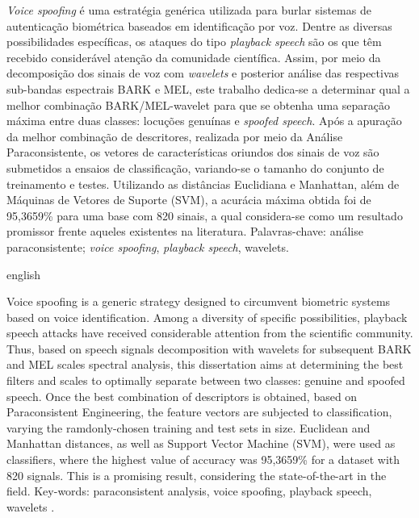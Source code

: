 \begin{resumo}
	\par \textit{Voice spoofing} é uma estratégia genérica utilizada para burlar sistemas de autenticação biométrica baseados em identificação por voz. Dentre as diversas possibilidades específicas, os ataques do tipo \textit{playback speech} são os que têm recebido considerável atenção da comunidade científica. Assim, por meio da decomposição dos sinais de voz com \textit{wavelets} e posterior análise das respectivas sub-bandas espectrais BARK e MEL, este trabalho dedica-se a determinar qual a melhor combinação BARK/MEL-wavelet para que se obtenha uma separação máxima entre duas classes: locuções genuínas e \textit{spoofed speech}. Após a apuração da melhor combinação de descritores, realizada por meio da Análise Paraconsistente, os vetores de características oriundos dos sinais de voz são submetidos a ensaios de classificação, variando-se o tamanho do conjunto de treinamento e testes. Utilizando as distâncias Euclidiana e Manhattan, além de Máquinas de Vetores de Suporte (SVM), a acurácia máxima obtida foi de 95,3659\% para uma base com 820 sinais, a qual considera-se como um resultado promissor frente aqueles existentes na literatura.\newline\newline
	Palavras-chave: análise paraconsistente; \textit{voice spoofing}, \textit{playback speech}, wavelets.
\end{resumo}

\begin{resumo}[Abstract]
	\begin{otherlanguage*}{english}
		\par Voice spoofing is a generic strategy designed to circumvent biometric systems based on voice identification. Among a diversity of specific possibilities, playback speech attacks have received considerable attention from the scientific community. Thus, based on speech signals decomposition with wavelets for subsequent BARK and MEL scales spectral analysis, this dissertation aims at determining the best filters and scales to optimally separate between two classes: genuine and spoofed speech. Once the best combination of descriptors is obtained, based on Paraconsistent Engineering, the feature vectors are subjected to classification, varying the ramdonly-chosen training and test sets in size. Euclidean and Manhattan distances, as well as Support Vector Machine (SVM), were used as classifiers, where the highest value of accuracy was 95,3659\% for a dataset with 820 signals. This is a promising result, considering the state-of-the-art in the field. \newline\newline
		Key-words: paraconsistent analysis, voice spoofing, playback speech, wavelets .
	\end{otherlanguage*}
\end{resumo}
